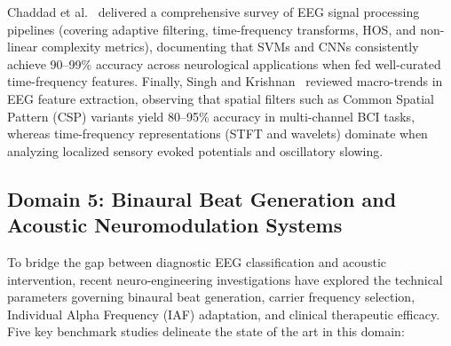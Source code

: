 \documentclass[12pt, a4paper]{report}
\begin{document}
Chaddad et al.~\cite{Chaddad2023} delivered a comprehensive survey of EEG signal processing pipelines (covering adaptive filtering, time-frequency transforms, HOS, and non-linear complexity metrics), documenting that SVMs and CNNs consistently achieve 90--99\% accuracy across neurological applications when fed well-curated time-frequency features. Finally, Singh and Krishnan~\cite{Singh2023} reviewed macro-trends in EEG feature extraction, observing that spatial filters such as Common Spatial Pattern (CSP) variants yield 80--95\% accuracy in multi-channel BCI tasks, whereas time-frequency representations (STFT and wavelets) dominate when analyzing localized sensory evoked potentials and oscillatory slowing.

\subsection{Domain 5: Binaural Beat Generation and Acoustic Neuromodulation Systems}
\label{subsec:lit_binaural_generation}
To bridge the gap between diagnostic EEG classification and acoustic intervention, recent neuro-engineering investigations have explored the technical parameters governing binaural beat generation, carrier frequency selection, Individual Alpha Frequency (IAF) adaptation, and clinical therapeutic efficacy. Five key benchmark studies delineate the state of the art in this domain:
\end{document}
